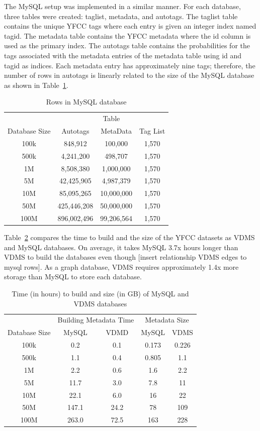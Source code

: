 The MySQL setup was implemented in a similar manner.  For each database, three tables were created: taglist, metadata, and autotags.  The taglist table contains the unique YFCC tags where each entry is given an integer index named tagid. The metadata table contains the YFCC metadata where the id column is used as the primary index. The autotags table contains the probabilities for the tags associated with the metadata entries of the metadata table using id and tagid as indices.  Each metadata entry has approximately nine tags; therefore, the number of rows in autotags is linearly related to the size of the MySQL database as shown in Table~\ref{table:mysqltables}.

\begin{table}[h]
\caption{Rows in MySQL database}
\centering
\begin{tabular}{c c c c}
\hline\hline
 & \multicolumn{3}{c}{Table}\\
\cline{2-4}
Database Size & Autotags & MetaData & Tag List\\
\hline
100k & 848,912 & 100,000 & 1,570\\
500k & 4,241,200 & 498,707 & 1,570\\
1M & 8,508,380 & 1,000,000 & 1,570\\
5M & 42,425,905 & 4,987,379 & 1,570\\
10M & 85,095,265 & 10,000,000 & 1,570\\
50M & 425,446,208 & 50,000,000 & 1,570\\
100M & 896,002,496 & 99,206,564 & 1,570\\
\hline
\end{tabular}
\label{table:mysqltables}
\end{table}

Table~\ref{table:metadata} compares the time to build and the size of the YFCC datasets as VDMS and MySQL databases.  On average, it takes MySQL 3.7x hours longer than VDMS to build the databases even though [insert relationship VDMS edges to mysql rows]. As a graph database, VDMS requires approximately 1.4x more storage than MySQL to store each database.

\begin{table}[h]
\caption{Time (in hours) to build and size (in GB) of MySQL and VDMS databases}
\centering
\begin{tabular}{c c c c c}
\hline\hline
 & \multicolumn{2}{c}{Building Metadata Time} & \multicolumn{2}{c}{Metadata Size}\\
\cline{2-3} \cline{4-5}%
Database Size & MySQL & VDMD & MySQL & VDMS\\
\hline
100k & 0.2 & 0.1 & 0.173 & 0.226\\
500k & 1.1 & 0.4 & 0.805 & 1.1\\
1M & 2.2 & 0.6 & 1.6 & 2.2\\
5M & 11.7 & 3.0 & 7.8 & 11\\
10M & 22.1 & 6.0 & 16 & 22\\
50M & 147.1 & 24.2 & 78 & 109\\
100M & 263.0 & 72.5 & 163 & 228\\
\hline
\end{tabular}
\label{table:metadata}
\end{table}

